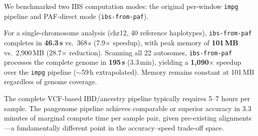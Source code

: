 We benchmarked two IBS computation modes: the original per-window \texttt{impg} pipeline and PAF-direct mode (\texttt{ibs-from-paf}).

For a single-chromosome analysis (chr12, 40 reference haplotypes), \texttt{ibs-from-paf} completes in \textbf{46.3\,s} vs.\ 368\,s (7.9$\times$ speedup), with peak memory of \textbf{101\,MB} vs.\ 2,900\,MB (28.7$\times$ reduction). Scanning all 22 autosomes, \texttt{ibs-from-paf} processes the complete genome in \textbf{195\,s} (3.3\,min), yielding a \textbf{1,090$\times$} speedup over the \texttt{impg} pipeline ($\sim$59\,h extrapolated). Memory remains constant at 101\,MB regardless of genome coverage.

The complete VCF-based IBD/ancestry pipeline typically requires 5--7 hours per sample. The pangenome pipeline achieves comparable or superior accuracy in 3.3\,minutes of marginal compute time per sample pair, given pre-existing alignments---a fundamentally different point in the accuracy--speed trade-off space.
